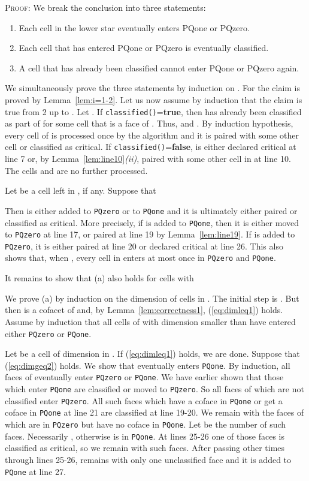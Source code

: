 \documentclass[12pt]{article}
\newenvironment{proof}{\noindent\textsc{Proof: }}{\hfill\par\medskip\par}
\newenvironment{aenum}{\begin{enumerate}
 \renewcommand{\theenumi}{\alph{enumi}}
 \renewcommand{\labelenumi}{(\theenumi)}}{\end{enumerate}}
\begin{document}
\begin{proof} We break the conclusion into three statements:
\begin{aenum}
\item Each cell in the lower star eventually enters PQone or PQzero.
\item Each cell that has entered PQone or PQzero is eventually classified.
\item A cell that has already been classified cannot enter PQone or PQzero again.
\end{aenum}

We simultaneously prove the three statements by induction on . For  the claim is proved by Lemma~\ref{lem:i=1-2}. Let us now assume by induction that the claim is true from 2 up to . Let . If \texttt{classified()}={\bf true}, then  has already been classified as part of  for some cell  that is a face of . Thus,  and . By induction hypothesis, every cell of  is processed once by the algorithm
and it is paired with some other cell or classified as critical. If \texttt{classified()}={\bf false},  is  either declared critical at line 7 or, by Lemma~\ref{lem:line10}{\em (ii)}, paired with some other cell  in  at line 10. The cells  and  are no further processed.

Let  be a cell left in , if any. Suppose that

Then  is either added to \texttt{PQzero} or to \texttt{PQone} and it is ultimately either paired or classified as critical. More precisely, if  is added to \texttt{PQone}, then it is either moved to \texttt{PQzero} at line 17, or paired at line 19 by Lemma~\ref{lem:line19}. If  is added to \texttt{PQzero}, it is either paired at line 20 or declared critical at line 26. This also shows that, when , every cell in  enters at most once in \texttt{PQzero} and \texttt{PQone}.

It remains to show that (a) also holds for cells  with

We prove (a) by induction on the dimension  of cells in . The initial step is . But then  is a cofacet of  and, by Lemma~\ref{lem:correctness1}, (\ref{eq:dimleq1}) holds. Assume by induction that all cells of  with dimension smaller than  have entered either \texttt{PQzero} or \texttt{PQone}.

Let  be a cell of dimension  in . If (\ref{eq:dimleq1}) holds, we are done. Suppose that (\ref{eq:dimgeq2}) holds. We show that  eventually enters \texttt{PQone}. By induction, all faces of  eventually enter \texttt{PQzero} or \texttt{PQone}. We have earlier shown that those which enter \texttt{PQone} are classified or moved to \texttt{PQzero}. So all faces of  which are not classified enter \texttt{PQzero}. All such faces which have a coface in \texttt{PQone} or get a coface in \texttt{PQone} at line 21 are classified at line 19-20. We remain with the faces of  which are in \texttt{PQzero} but have no coface in \texttt{PQone}. Let  be the number of such faces. Necessarily , otherwise  is in \texttt{PQone}. At lines 25-26 one of those faces is classified as critical, so we remain with  such faces.  After passing other  times through lines 25-26,  remains with only one unclassified face and it is added to \texttt{PQone} at line 27.


\end{proof}
\end{document}
